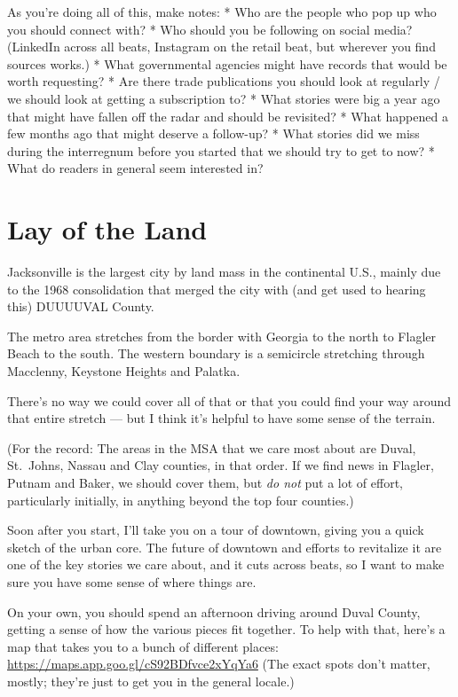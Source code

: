 \documentclass[
  11pt,
  american,
  letterpaperpaper,
  extrafontsizes,onecolumn,openright
  ]{memoir}
\begin{document}
As you're doing all of this, make notes:
* Who are the people who pop up who you should connect with?
* Who should you be following on social media? (LinkedIn across all beats, Instagram on the retail beat, but wherever you find sources works.)
* What governmental agencies might have records that would be worth requesting?
* Are there trade publications you should look at regularly / we should look at getting a subscription to?
* What stories were big a year ago that might have fallen off the radar and should be revisited?
* What happened a few months ago that might deserve a follow-up?
* What stories did we miss during the interregnum before you started that we should try to get to now?
* What do readers in general seem interested in?

\hypertarget{lay-of-the-land}{%
\section*{Lay of the Land}\label{lay-of-the-land}}

Jacksonville is the largest city by land mass in the continental U.S., mainly due to the 1968 consolidation that merged the city with (and get used to hearing this) DUUUUVAL County.

The metro area stretches from the border with Georgia to the north to Flagler Beach to the south. The western boundary is a semicircle stretching through Macclenny, Keystone Heights and Palatka.

There's no way we could cover all of that or that you could find your way around that entire stretch --- but I think it's helpful to have some sense of the terrain.

(For the record: The areas in the MSA that we care most about are Duval, St.~Johns, Nassau and Clay counties, in that order. If we find news in Flagler, Putnam and Baker, we should cover them, but \emph{do not} put a lot of effort, particularly initially, in anything beyond the top four counties.)

Soon after you start, I'll take you on a tour of downtown, giving you a quick sketch of the urban core. The future of downtown and efforts to revitalize it are one of the key stories we care about, and it cuts across beats, so I want to make sure you have some sense of where things are.

On your own, you should spend an afternoon driving around Duval County, getting a sense of how the various pieces fit together. To help with that, here's a map that takes you to a bunch of different places: \url{https://maps.app.goo.gl/cS92BDfvce2xYqYa6} (The exact spots don't matter, mostly; they're just to get you in the general locale.)
\end{document}

